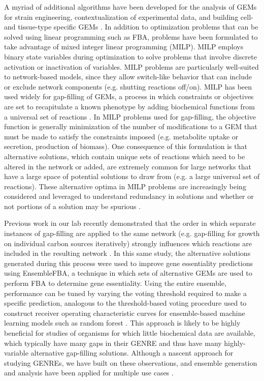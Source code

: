 \documentclass[11pt,twocolumn,notitlepage,openany,twoside]{book}
\begin{document}
\begin{refsection}
A myriad of additional algorithms have been developed for the analysis of GEMs for strain engineering, contextualization of experimental data, and building cell- and tissue-type specific GEMs \cite{Blazier2012-oo,Machado2014-wi,Wang2017-sp}. In addition to optimization problems that can be solved using linear programming such as FBA, problems have been formulated to take advantage of mixed integer linear programming (MILP). MILP employs binary state variables during optimization to solve problems that involve discrete activation or inactivation of variables. MILP problems are particularly well-suited to network-based models, since they allow switch-like behavior that can include or exclude network components (e.g. shutting reactions off/on). MILP has been used widely for gap-filling of GEMs, a process in which constraints or objectives are set to recapitulate a known phenotype by adding biochemical functions from a universal set of reactions \cite{Reed2006-qv}. In MILP problems used for gap-filling, the objective function is generally minimization of the number of modifications to a GEM that must be made to satisfy the constraints imposed (e.g. metabolite uptake or secretion, production of biomass). One consequence of this formulation is that alternative solutions, which contain unique sets of reactions which need to be altered in the network or added, are extremely common for large networks that have a large space of potential solutions to draw from (e.g. a large universal set of reactions). These alternative optima in MILP problems are increasingly being considered and leveraged to understand redundancy in solutions and whether or not portions of a solution may be spurious \cite{Karp2018-hd,Robaina-Estevez2017-fy,Rossell2013-cf}.

Previous work in our lab recently demonstrated that the order in which separate instances of gap-filling are applied to the same network (e.g. gap-filling for growth on individual carbon sources iteratively) strongly influences which reactions are included in the resulting network \cite{Biggs2017-md}. In this same study, the alternative solutions generated during this process were used to improve gene essentiality predictions using EnsembleFBA, a technique in which sets of alternative GEMs are used to perform FBA to determine gene essentiality. Using the entire ensemble, performance can be tuned by varying the voting threshold required to make a specific prediction, analogous to the threshold-based voting procedure used to construct receiver operating characteristic curves for ensemble-based machine learning models such as random forest \cite{Breiman2001-pl}. This approach is likely to be highly beneficial for studies of organisms for which little biochemical data are available, which typically have many gaps in their GENRE and thus have many highly-variable alternative gap-filling solutions. Although a nascent approach for studying GENREs, we have built on these observations, and ensemble generation and analysis have been applied for multiple use cases \cite{Machado2018-cz,Medlock2018-ub,Medlock2018-kx}.


\end{refsection}
\end{document}
